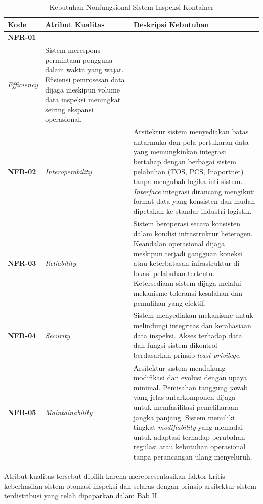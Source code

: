 \begin{table}[ht]
\centering
\scriptsize
\caption{Kebutuhan Nonfungsional Sistem Inspeksi Kontainer}
\label{tbl:kebutuhan_nonfungsional}
\begin{tabular}{p{} p{} p{}}
\toprule
\textbf{Kode} & \textbf{Atribut Kualitas} & \textbf{Deskripsi Kebutuhan} \\
\midrule
\textbf{NFR-01} & \makecell[l]{\textit{Performance}\\\textit{Efficiency}}
& Sistem merespons permintaan pengguna dalam waktu yang wajar. Efisiensi pemrosesan data dijaga meskipun volume data inspeksi meningkat seiring ekspansi operasional. \\
\textbf{NFR-02} & \textit{Interoperability}
& Arsitektur sistem menyediakan batas antarmuka dan pola pertukaran data yang memungkinkan integrasi bertahap dengan berbagai sistem pelabuhan (TOS, PCS, Inaportnet) tanpa mengubah logika inti sistem. \textit{Interface} integrasi dirancang mengikuti format data yang konsisten dan mudah dipetakan ke standar industri logistik. \\
\textbf{NFR-03} & \textit{Reliability}
& Sistem beroperasi secara konsisten dalam kondisi infrastruktur heterogen. Keandalan operasional dijaga meskipun terjadi gangguan koneksi atau keterbatasan infrastruktur di lokasi pelabuhan tertentu. Ketersediaan sistem dijaga melalui mekanisme toleransi kesalahan dan pemulihan yang efektif. \\
\textbf{NFR-04} & \textit{Security}
& Sistem menyediakan mekanisme untuk melindungi integritas dan kerahasiaan data inspeksi. Akses terhadap data dan fungsi sistem dikontrol berdasarkan prinsip \textit{least privilege}. \\
\textbf{NFR-05} & \textit{Maintainability}
& Arsitektur sistem mendukung modifikasi dan evolusi dengan upaya minimal. Pemisahan tanggung jawab yang jelas antarkomponen dijaga untuk memfasilitasi pemeliharaan jangka panjang. Sistem memiliki tingkat \textit{modifiability} yang memadai untuk adaptasi terhadap perubahan regulasi atau kebutuhan operasional tanpa perancangan ulang menyeluruh. \\
\bottomrule
\end{tabular}
\end{table}

\FloatBarrier

Atribut kualitas tersebut dipilih karena merepresentasikan faktor kritis keberhasilan sistem otomasi inspeksi dan selaras dengan prinsip arsitektur sistem terdistribusi yang telah dipaparkan dalam Bab II.

